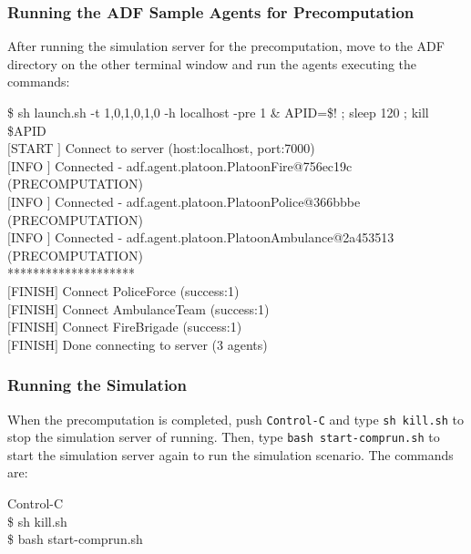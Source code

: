\documentclass[a4paper]{article}
\begin{document}
\subsubsection{Running the ADF Sample Agents for Precomputation}
After running the simulation server for the precomputation, move to the ADF directory on the other terminal window and run the agents executing the commands:

\begin{center}
   \begin{tcolorbox}[title=Running Sample Agents, width=.98\linewidth]
    {\ttfamily
    \$ sh launch.sh -t 1,0,1,0,1,0 -h localhost -pre 1 \& APID=\$! ; sleep 120 ;
    kill \$APID\\
    $[$START $]$ Connect to server (host:localhost, port:7000)\\
    $[$INFO  $]$ Connected - adf.agent.platoon.PlatoonFire@756ec19c (PRECOMPUTATION)\\
    $[$INFO  $]$ Connected - adf.agent.platoon.PlatoonPolice@366bbbe (PRECOMPUTATION)\\
    $[$INFO  $]$ Connected - adf.agent.platoon.PlatoonAmbulance@2a453513 (PRECOMPUTATION)\\
    ********************\\
    $[$FINISH$]$ Connect PoliceForce (success:1)\\
    $[$FINISH$]$ Connect AmbulanceTeam (success:1)\\
    $[$FINISH$]$ Connect FireBrigade (success:1)\\
    $[$FINISH$]$ Done connecting to server (3 agents)
    }
  \end{tcolorbox}
\end{center}
\subsubsection{Running the Simulation}
When the precomputation is completed, push \texttt{Control-C} and type \texttt{sh kill.sh} to stop the simulation server of running. Then, type \texttt{bash start-comprun.sh} to start the simulation server again to run the simulation scenario. The commands are:

\begin{center}
   \begin{tcolorbox}[title=Running Simulation Server, width=.98\linewidth]
    {\ttfamily
    Control-C\\
    \$ sh kill.sh\\
    \$ bash start-comprun.sh
    }
  \end{tcolorbox}
\end{center}
\end{document}

